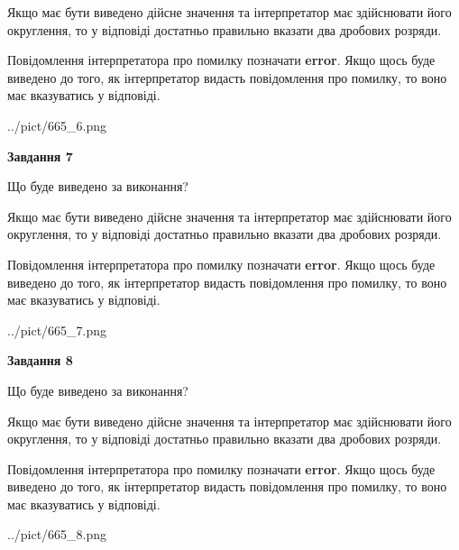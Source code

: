 \documentclass[12pt, ukrainian]{article}
\begin{document}
{\begin {Large}
Якщо має бути виведено дійсне значення та інтерпретатор має здійснювати його округлення, 
то у відповіді достатньо правильно вказати два дробових розряди.

Повідомлення інтерпретатора про помилку позначати \textbf{error}.
Якщо щось буде виведено до того, як інтерпретатор видасть повідомлення про помилку, 
то воно має вказуватись у відповіді. \par

\begin{center}
	{../pict/665_6.png}
\end{center}
\newpage

{\begin {center}\textbf{Завдання 7}\end {center}}\par
Що буде виведено за виконання? \par

Якщо має бути виведено дійсне значення та інтерпретатор має здійснювати його округлення, 
то у відповіді достатньо правильно вказати два дробових розряди.

Повідомлення інтерпретатора про помилку позначати \textbf{error}.
Якщо щось буде виведено до того, як інтерпретатор видасть повідомлення про помилку, 
то воно має вказуватись у відповіді. \par

\begin{center}
	{../pict/665_7.png}
\end{center}
\newpage

{\begin {center}\textbf{Завдання 8}\end {center}}\par
Що буде виведено за виконання? \par

Якщо має бути виведено дійсне значення та інтерпретатор має здійснювати його округлення, 
то у відповіді достатньо правильно вказати два дробових розряди.

Повідомлення інтерпретатора про помилку позначати \textbf{error}.
Якщо щось буде виведено до того, як інтерпретатор видасть повідомлення про помилку, 
то воно має вказуватись у відповіді. \par

\begin{center}
	{../pict/665_8.png}
\end{center}
\newpage


\end{Large}}
\end{document}
